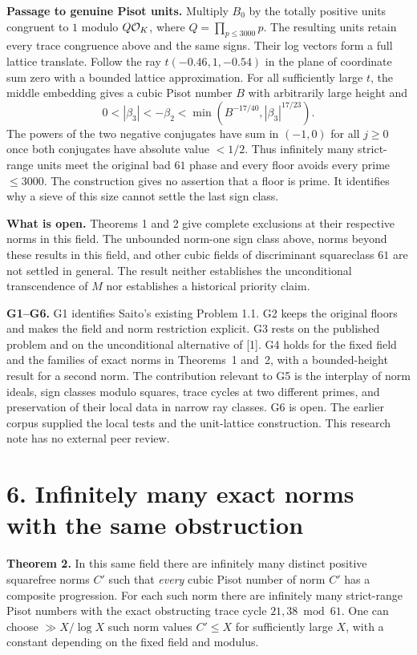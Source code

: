 \documentclass[11pt,a4paper,oneside,openany]{book}
\newcommand{\lead}[1]{\textbf{#1}\enspace}\let\para\lead
\newcommand{\localhead}[1]{\needspace{5\baselineskip}\section*{\color{ink}#1}}
\let\sect\localhead\let\secx\localhead\let\head\localhead
\begin{document}
\lead{Passage to genuine Pisot units.} Multiply $B_0$ by the totally positive units congruent to $1$ modulo $Q\mathcal O_K$, where $Q=\prod_{p\le3000}p$. The resulting units retain every trace congruence above and the same signs. Their log vectors form a full lattice translate. Follow the ray $t(-0.46,1,-0.54)$ in the plane of coordinate sum zero with a bounded lattice approximation. For all sufficiently large $t$, the middle embedding gives a cubic Pisot number $B$ with arbitrarily large height and
\[
 0<|\beta_3|<-\beta_2<\min(B^{-17/40},|\beta_3|^{17/23}).
\]
The powers of the two negative conjugates have sum in $(-1,0)$ for all $j\ge0$ once both conjugates have absolute value $<1/2$. Thus infinitely many strict-range units meet the original bad $61$ phase and every floor avoids every prime $\le3000$. The construction gives no assertion that a floor is prime. It identifies why a sieve of this size cannot settle the last sign class.

\lead{What is open.} Theorems 1 and 2 give complete exclusions at their respective norms in this field. The unbounded norm-one sign class above, norms beyond these results in this field, and other cubic fields of discriminant squareclass $61$ are not settled in general. The result neither establishes the unconditional transcendence of $M$ nor establishes a historical priority claim.

\lead{G1--G6.} G1 identifies Saito's existing Problem 1.1. G2 keeps the original floors and makes the field and norm restriction explicit. G3 rests on the published problem and on the unconditional alternative of [1]. G4 holds for the fixed field and the families of exact norms in Theorems~1 and~2, with a bounded-height result for a second norm. The contribution relevant to G5 is the interplay of norm ideals, sign classes modulo squares, trace cycles at two different primes, and preservation of their local data in narrow ray classes. G6 is open. The earlier corpus supplied the local tests and the unit-lattice construction. This research note has no external peer review.



\sect{6. Infinitely many exact norms with the same obstruction}
\lead{Theorem 2.} In this same field there are infinitely many distinct positive squarefree norms $C'$ such that \emph{every} cubic Pisot number of norm $C'$ has a composite progression. For each such norm there are infinitely many strict-range Pisot numbers with the exact obstructing trace cycle $21,38\bmod61$. One can choose $\gg X/\log X$ such norm values $C'\le X$ for sufficiently large $X$, with a constant depending on the fixed field and modulus.
\end{document}
